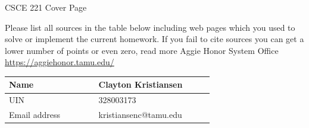 \documentclass[english]{article}
\begin{document}

\begin{centering}
    {\Large CSCE 221 Cover Page} \\ \medskip    
\end{centering}

Please list all sources in the table below including web pages which you used to solve or implement the current homework. If you fail to cite sources you can get a lower number of points or even zero, read more Aggie Honor System Office \url{https://aggiehonor.tamu.edu/} \\

\noindent
\begin{center}
    {\large
    \begin{tabular}{|p{0.35\linewidth}|p{0.45\linewidth}|} \hline
        Name          & Clayton Kristiansen         \\ \hline
        UIN           & 328003173         \\ \hline
        Email address & kristiansenc@tamu.edu      \\ \hline
    \end{tabular}
    }
\end{center}
\end{document}
